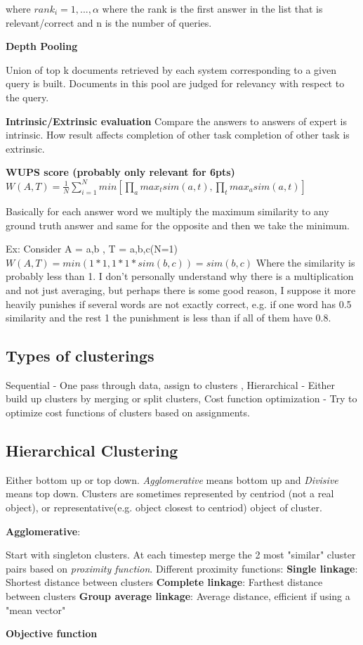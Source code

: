 \documentclass[a4paper,10pt,landscape]{article}
\newcommand{\topic}[1]{\begin{center}\section*{#1}\end{center}}
\begin{document}
\begin{multicols}{3}
where $rank_i = 1,...,\alpha$ where the rank is the first answer in the list that is relevant/correct and n is the number of queries.

\textbf{Depth Pooling}

Union of top k documents retrieved by each system corresponding to a given query is built. Documents in this pool are judged for relevancy with respect to the query.

\textbf{Intrinsic/Extrinsic evaluation}
Compare the answers to answers of expert is intrinsic. How result affects completion of other task completion of other task is extrinsic.

\textbf{WUPS score (probably only relevant for 6pts)}
$W(A,T) = \frac{1}{N} \sum_{i=1}^{N}min[\prod_{a}max_tsim(a,t),\prod_tmax_asim(a,t)]$

Basically for each answer word we multiply the maximum similarity to any ground truth answer and same for the opposite and then we take the minimum.

Ex:
Consider A = {a,b} , T = {a,b,c}(N=1)
$W(A,T) = min(1*1,1*1*sim(b,c))=sim(b,c)$
Where the similarity is probably less than 1. I don't personally understand why there is a multiplication and not just averaging, but perhaps there is some good reason, I suppose it more heavily punishes if several words are not exactly correct, e.g. if one word has 0.5 similarity and the rest 1 the punishment is less than if all of them have 0.8.

\topic{Types of clusterings}
Sequential - One pass through data, assign to clusters , Hierarchical - Either build up clusters by merging or split clusters, Cost function optimization - Try to optimize cost functions of clusters based on assignments. 
\topic{Hierarchical Clustering}
Either bottom up or top down. \textit{Agglomerative} means bottom up and \textit{Divisive} means top down.
Clusters are sometimes represented by centriod (not a real object), or representative(e.g. object closest to centriod) object of cluster.

\textbf{Agglomerative}:

Start with singleton clusters. At each timestep merge the 2 most "similar" cluster pairs based on \textit{proximity function}.
Different proximity functions:
\textbf{Single linkage}: Shortest distance between clusters
\textbf{Complete linkage}: Farthest distance between clusters
\textbf{Group average linkage}: Average distance, efficient if using a "mean vector"

\textbf{Objective function}


\end{multicols}
\end{document}
